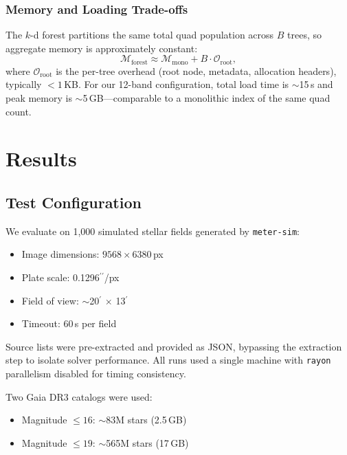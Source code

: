 \documentclass[twocolumn, 10pt]{article}
\newcommand{\arcsec}{\ensuremath{^{\prime\prime}}}
\newcommand{\arcmin}{\ensuremath{^{\prime}}}
\begin{document}
\subsubsection{Memory and Loading Trade-offs}

The $k$-d forest partitions the same total quad population across $B$
trees, so aggregate memory is approximately constant:
\begin{equation}
    \mathcal{M}_{\text{forest}} \approx \mathcal{M}_{\text{mono}}
    + B \cdot \mathcal{O}_{\text{root}},
\end{equation}
where $\mathcal{O}_{\text{root}}$ is the per-tree overhead (root node,
metadata, allocation headers), typically $< 1$\,KB. For our 12-band
configuration, total load time is $\sim$15\,s and peak memory is
$\sim$5\,GB---comparable to a monolithic index of the same quad count.

\section{Results} \label{sec:results}

\subsection{Test Configuration} \label{sec:testconfig}

We evaluate on 1{,}000 simulated stellar fields generated by
\texttt{meter-sim}:
\begin{itemize}
    \item Image dimensions: $9568 \times 6380$\,px
    \item Plate scale: 0.1296\arcsec/px
    \item Field of view: $\sim$20\arcmin{} $\times$ 13\arcmin{}
    \item Timeout: 60\,s per field
\end{itemize}

Source lists were pre-extracted and provided as JSON, bypassing the
extraction step to isolate solver performance. All runs used a single
machine with \texttt{rayon} parallelism disabled for timing consistency.

Two Gaia DR3 catalogs were used:
\begin{itemize}
    \item Magnitude $\leq 16$: $\sim$83M stars (2.5\,GB)
    \item Magnitude $\leq 19$: $\sim$565M stars (17\,GB)
\end{itemize}
\end{document}

